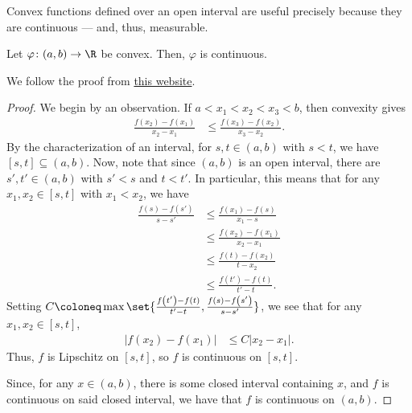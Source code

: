 \documentclass[12pt]{mypackage}
\begin{document}
Convex functions defined over an open interval are useful precisely because they are continuous --- and, thus, measurable.
\begin{theorem}
  Let $\varphi\colon (a,b)\rightarrow \R$ be convex. Then, $\varphi$ is continuous.
\end{theorem}
We follow the proof from \href{https://unapologetic.wordpress.com/2008/04/15/convex-functions-are-continuous/}{this website}.
\begin{proof}
  We begin by an observation. If $a < x_1 < x_2 < x_3 < b$, then convexity gives
  \begin{align*}
    \frac{f\left( x_2 \right)- f\left( x_1 \right)}{x_2 - x_1} &\leq \frac{f\left( x_3 \right)-f\left( x_2 \right)}{x_3 - x_2}. \label{eq:convexity_fraction_inequality}\tag{\textasteriskcentered}
  \end{align*}
  By the characterization of an interval, for $s , t\in \left( a,b \right)$ with $s < t$, we have $\left[ s,t \right]\subseteq \left( a,b \right)$. Now, note that since $\left( a,b \right)$ is an open interval, there are $s',t'\in \left( a,b \right)$ with $s' < s$ and $t < t'$. In particular, this means that for any $x_1,x_2\in \left[ s,t \right]$ with $x_1 < x_2$, we have
  \begin{align*}
    \frac{f\left( s \right) - f\left( s' \right)}{s-s'} &\leq \frac{f\left( x_1 \right) - f\left( s \right)}{x_1 - s}\\
                                                        &\leq \frac{f\left( x_2 \right) - f\left( x_1 \right)}{x_2 - x_1}\\
                                                        &\leq  \frac{f\left( t \right) - f\left( x_2 \right)}{t-x_2}\\
                                                        &\leq \frac{f\left( t' \right)-f\left( t \right)}{t'-t}.
  \end{align*}
  Setting $C\coloneq \max\set{\frac{f\left( t' \right)-f\left( t \right)}{t'-t},\frac{f\left( s \right)-f\left( s' \right)}{s-s'}}$, we see that for any $x_1,x_2\in \left[ s,t \right]$,
  \begin{align*}
    \left\vert f\left( x_2 \right)-f\left( x_1 \right) \right\vert &\leq C \left\vert x_2 - x_1 \right\vert.
  \end{align*}
  Thus, $f$ is Lipschitz on $\left[ s,t \right]$, so $f$ is continuous on $\left[ s,t \right]$.\newline

  Since, for any $x\in \left( a,b \right)$, there is some closed interval containing $x$, and $f$ is continuous on said closed interval, we have that $f$ is continuous on $\left( a,b \right)$.
\end{proof}
\end{document}
